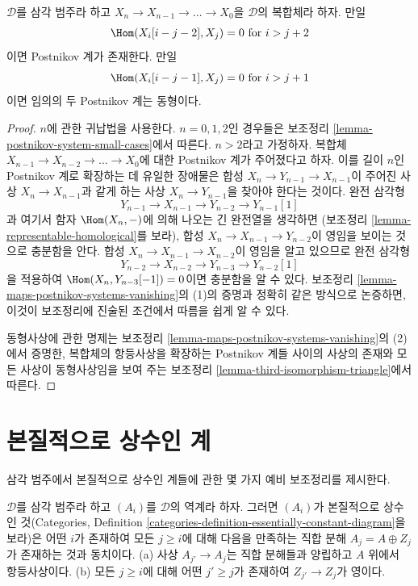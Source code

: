 \begin{lemma}
\label{lemma-existence-postnikov-system}
$\mathcal{D}$를 삼각 범주라 하고
$X_n \to X_{n - 1} \to \ldots \to X_0$을 $\mathcal{D}$의 복합체라
하자. 만일
$$
\Hom(X_i[i - j - 2], X_j) = 0 \text{ for }i > j + 2
$$
이면 Postnikov 계가 존재한다. 만일
$$
\Hom(X_i[i - j - 1], X_j) = 0 \text{ for }i > j + 1
$$
이면 임의의 두 Postnikov 계는 동형이다.
\end{lemma}

\begin{proof}
$n$에 관한 귀납법을 사용한다. $n = 0, 1, 2$인 경우들은 보조정리
\ref{lemma-postnikov-system-small-cases}에서 따른다. $n > 2$라고
가정하자. 복합체 $X_{n - 1} \to X_{n - 2} \to \ldots \to X_0$에 대한
Postnikov 계가 주어졌다고 하자. 이를 길이 $n$인 Postnikov 계로
확장하는 데 유일한 장애물은 합성
$X_n \to Y_{n - 1} \to X_{n - 1}$이 주어진 사상
$X_n \to X_{n - 1}$과 같게 하는 사상 $X_n \to Y_{n - 1}$을 찾아야
한다는 것이다. 완전 삼각형
$$
Y_{n - 1} \to X_{n - 1} \to Y_{n - 2} \to Y_{n - 1}[1]
$$
과 여기서 함자 $\Hom(X_n, -)$에 의해 나오는 긴 완전열을 생각하면
(보조정리 \ref{lemma-representable-homological}를 보라), 합성
$X_n \to X_{n - 1} \to Y_{n - 2}$이 영임을 보이는 것으로 충분함을
안다. 합성 $X_n \to X_{n - 1} \to X_{n - 2}$이 영임을 알고 있으므로
완전 삼각형
$$
Y_{n - 2} \to X_{n - 2} \to Y_{n - 3} \to Y_{n - 2}[1]
$$
을 적용하여 $\Hom(X_n, Y_{n - 3}[-1]) = 0$이면 충분함을 알 수 있다.
보조정리 \ref{lemma-maps-postnikov-systems-vanishing}의 (1)의 증명과
정확히 같은 방식으로 논증하면, 이것이 보조정리에 진술된 조건에서
따름을 쉽게 알 수 있다.

\medskip\noindent
동형사상에 관한 명제는 보조정리
\ref{lemma-maps-postnikov-systems-vanishing}의 (2)에서 증명한, 복합체의
항등사상을 확장하는 Postnikov 계들 사이의 사상의 존재와 모든 사상이
동형사상임을 보여 주는 보조정리 \ref{lemma-third-isomorphism-triangle}에서
따른다.
\end{proof}

\section{본질적으로 상수인 계}
\label{section-essentially-constant}

\noindent
삼각 범주에서 본질적으로 상수인 계들에 관한 몇 가지 예비 보조정리를
제시한다.

\begin{lemma}
\label{lemma-essentially-constant}
$\mathcal{D}$를 삼각 범주라 하고 $(A_i)$를 $\mathcal{D}$의 역계라 하자.
그러면 $(A_i)$가 본질적으로 상수인 것(Categories, Definition
\ref{categories-definition-essentially-constant-diagram}을 보라)은
어떤 $i$가 존재하여 모든 $j \geq i$에 대해 다음을 만족하는 직합 분해
$A_j = A \oplus Z_j$가 존재하는 것과 동치이다. (a) 사상
$A_{j'} \to A_j$는 직합 분해들과 양립하고 $A$ 위에서 항등사상이다.
(b) 모든 $j \geq i$에 대해 어떤 $j' \geq j$가 존재하여
$Z_{j'} \to Z_j$가 영이다.
\end{lemma}

